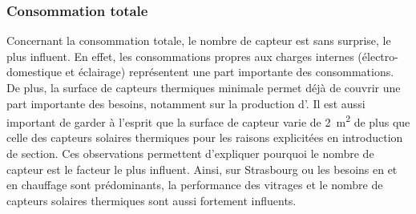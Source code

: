 \subsubsection{Consommation totale} %
\label{ssub:consommation_totale}
Concernant la consommation totale, le nombre de capteur  est sans surprise, le
plus influent. En effet, les consommations propres aux charges internes (électro-
domestique et éclairage) représentent une part importante des consommations. De plus, la
surface de capteurs thermiques minimale permet déjà de couvrir une part importante des
besoins, notamment sur la production d’. Il est aussi important de garder à
l’esprit que la surface de capteur  varie de \SI{2}{\metre\squared} de plus que
celle des capteurs solaires thermiques pour les raisons explicitées en introduction de
section. Ces observations permettent d’expliquer pourquoi le nombre de capteur 
est le facteur le plus influent. Ainsi, sur Strasbourg ou les besoins en  et
en chauffage sont prédominants, la performance des vitrages et le nombre de capteurs
solaires thermiques sont aussi fortement influents.


